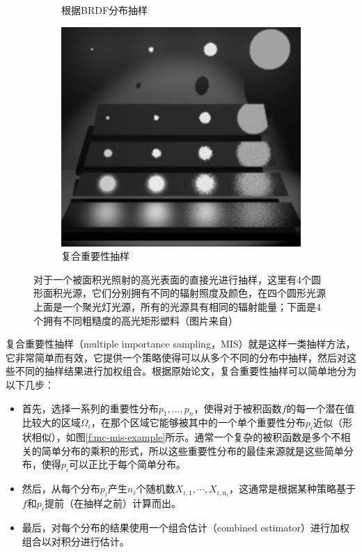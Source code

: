 \begin{figure}
\begin{subfigure}[b]{0.328\textwidth}
		\caption{根据BRDF分布抽样}
	\end{subfigure}
	\begin{subfigure}[b]{0.328\textwidth}
		\includegraphics[width=1.0\textwidth]{figures/mc/mis-3}
		\caption{复合重要性抽样}
	\end{subfigure}
	\caption{对于一个被面积光照射的高光表面的直接光进行抽样，这里有4个圆形面积光源，它们分别拥有不同的辐射照度及颜色，在四个圆形光源上面是一个聚光灯光源，所有的光源具有相同的辐射能量；下面是4个拥有不同粗糙度的高光矩形塑料（图片来自\cite{a:OptimallyCombiningSamplingTechniquesforMonteCarloRendering}）}
	\label{f:mc-mis}
\end{figure}

复合重要性抽样（multiple importance sampling，MIS）就是这样一类抽样方法，它非常简单而有效，它提供一个策略使得可以从多个不同的分布中抽样，然后对这些不同的抽样结果进行加权组合。根据原始论文\cite{a:OptimallyCombiningSamplingTechniquesforMonteCarloRendering}，复合重要性抽样可以简单地分为以下几步：

\begin{itemize}
	\item 首先，选择一系列的重要性分布$p_1,...,p_n$，使得对于被积函数$f$的每一个潜在值比较大的区域$\Omega_i$，在那个区域它能够被其中的一个单个重要性分布$p_i$近似（形状相似），如图\ref{f:mc-mis-example}所示。通常一个复杂的被积函数是多个不相关的简单分布的乘积的形式，所以这些重要性分布的最佳来源就是这些简单分布，使得$p_i$可以正比于每个简单分布。
	\item 然后，从每个分布$p_i$产生$n_i$个随机数$X_{i,1},\cdots,X_{i,n_i}$，这通常是根据某种策略基于$f$和$p_i$提前（在抽样之前）计算而出。
	\item 最后，对每个分布的结果使用一个组合估计（combined estimator）进行加权组合以对积分进行估计。 
\end{itemize}

